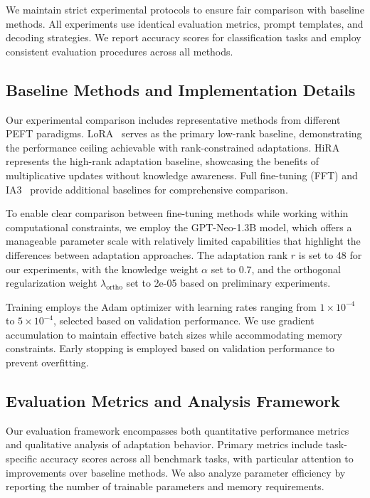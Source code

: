 \documentclass[10pt,letterpaper]{article}
\begin{document}
We maintain strict experimental protocols to ensure fair comparison with baseline methods. All experiments use identical evaluation metrics, prompt templates, and decoding strategies. We report accuracy scores for classification tasks and employ consistent evaluation procedures across all methods.

\subsection{Baseline Methods and Implementation Details}

Our experimental comparison includes representative methods from different PEFT paradigms. LoRA~\citep{hu2021lora} serves as the primary low-rank baseline, demonstrating the performance ceiling achievable with rank-constrained adaptations. HiRA~\citep{huang2024hira} represents the high-rank adaptation baseline, showcasing the benefits of multiplicative updates without knowledge awareness. Full fine-tuning (FFT) and IA3~\citep{liu2022few} provide additional baselines for comprehensive comparison.

To enable clear comparison between fine-tuning methods while working within computational constraints, we employ the GPT-Neo-1.3B model, which offers a manageable parameter scale with relatively limited capabilities that highlight the differences between adaptation approaches. The adaptation rank $r$ is set to 48 for our experiments, with the knowledge weight $\alpha$ set to 0.7, and the orthogonal regularization weight $\lambda_{\text{ortho}}$ set to 2e-05 based on preliminary experiments.

Training employs the Adam optimizer with learning rates ranging from $1 \times 10^{-4}$ to $5 \times 10^{-4}$, selected based on validation performance. We use gradient accumulation to maintain effective batch sizes while accommodating memory constraints. Early stopping is employed based on validation performance to prevent overfitting.

\subsection{Evaluation Metrics and Analysis Framework}

Our evaluation framework encompasses both quantitative performance metrics and qualitative analysis of adaptation behavior. Primary metrics include task-specific accuracy scores across all benchmark tasks, with particular attention to improvements over baseline methods. We also analyze parameter efficiency by reporting the number of trainable parameters and memory requirements.
\end{document}
